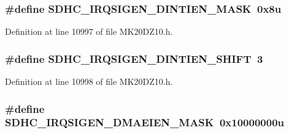 \subsubsection[{\texorpdfstring{S\+D\+H\+C\+\_\+\+I\+R\+Q\+S\+I\+G\+E\+N\+\_\+\+D\+I\+N\+T\+I\+E\+N\+\_\+\+M\+A\+SK}{SDHC_IRQSIGEN_DINTIEN_MASK}}]{\setlength{\rightskip}{0pt plus 5cm}\#define S\+D\+H\+C\+\_\+\+I\+R\+Q\+S\+I\+G\+E\+N\+\_\+\+D\+I\+N\+T\+I\+E\+N\+\_\+\+M\+A\+SK~0x8u}\hypertarget{group___s_d_h_c___register___masks_ga9414ef10609a933fd60a109700f44498}{}\label{group___s_d_h_c___register___masks_ga9414ef10609a933fd60a109700f44498}


Definition at line 10997 of file M\+K20\+D\+Z10.\+h.

\subsubsection[{\texorpdfstring{S\+D\+H\+C\+\_\+\+I\+R\+Q\+S\+I\+G\+E\+N\+\_\+\+D\+I\+N\+T\+I\+E\+N\+\_\+\+S\+H\+I\+FT}{SDHC_IRQSIGEN_DINTIEN_SHIFT}}]{\setlength{\rightskip}{0pt plus 5cm}\#define S\+D\+H\+C\+\_\+\+I\+R\+Q\+S\+I\+G\+E\+N\+\_\+\+D\+I\+N\+T\+I\+E\+N\+\_\+\+S\+H\+I\+FT~3}\hypertarget{group___s_d_h_c___register___masks_gaafe7e328f182b268af1b86b90f8430c8}{}\label{group___s_d_h_c___register___masks_gaafe7e328f182b268af1b86b90f8430c8}


Definition at line 10998 of file M\+K20\+D\+Z10.\+h.

\subsubsection[{\texorpdfstring{S\+D\+H\+C\+\_\+\+I\+R\+Q\+S\+I\+G\+E\+N\+\_\+\+D\+M\+A\+E\+I\+E\+N\+\_\+\+M\+A\+SK}{SDHC_IRQSIGEN_DMAEIEN_MASK}}]{\setlength{\rightskip}{0pt plus 5cm}\#define S\+D\+H\+C\+\_\+\+I\+R\+Q\+S\+I\+G\+E\+N\+\_\+\+D\+M\+A\+E\+I\+E\+N\+\_\+\+M\+A\+SK~0x10000000u}\hypertarget{group___s_d_h_c___register___masks_gae22dd330ad7d3c84dc6906ad0303ccc5}{}\label{group___s_d_h_c___register___masks_gae22dd330ad7d3c84dc6906ad0303ccc5}


